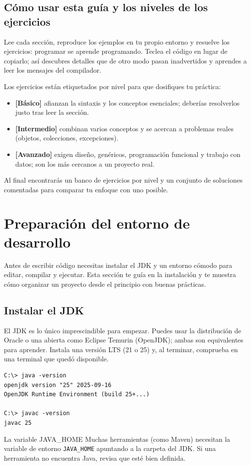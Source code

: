 \documentclass[11pt]{article}
\begin{document}
\subsection{Cómo usar esta guía y los niveles de los ejercicios}
Lee cada sección, reproduce los ejemplos en tu propio entorno y resuelve los ejercicios: programar se aprende programando. Teclea el código en lugar de copiarlo; así descubres detalles que de otro modo pasan inadvertidos y aprendes a leer los mensajes del compilador.

Los ejercicios están etiquetados por nivel para que dosifiques tu práctica:

\begin{itemize}[leftmargin=1.4em,itemsep=2pt,topsep=2pt]
\item \textbf{[Básico]} afianzan la sintaxis y los conceptos esenciales; deberías resolverlos justo tras leer la sección.
\item \textbf{[Intermedio]} combinan varios conceptos y se acercan a problemas reales (objetos, colecciones, excepciones).
\item \textbf{[Avanzado]} exigen diseño, genéricos, programación funcional y trabajo con datos; son los más cercanos a un proyecto real.
\end{itemize}
Al final encontrarás un banco de ejercicios por nivel y un conjunto de soluciones comentadas para comparar tu enfoque con uno posible.

\section{Preparación del entorno de desarrollo}
Antes de escribir código necesitas instalar el JDK y un entorno cómodo para editar, compilar y ejecutar. Esta sección te guía en la instalación y te muestra cómo organizar un proyecto desde el principio con buenas prácticas.

\subsection{Instalar el JDK}
El JDK es lo único imprescindible para empezar. Puedes usar la distribución de Oracle o una abierta como Eclipse Temurin (OpenJDK); ambas son equivalentes para aprender. Instala una versión LTS (21 o 25) y, al terminar, comprueba en una terminal que quedó disponible.

\begin{cajacodigo}
\begin{lstlisting}[style=markup]
C:\> java -version
openjdk version "25" 2025-09-16
OpenJDK Runtime Environment (build 25+...)

C:\> javac -version
javac 25
\end{lstlisting}
\end{cajacodigo}
\vspace{2pt}
\begin{cajatip}{La variable JAVA\_HOME}
Muchas herramientas (como Maven) necesitan la variable de entorno \texttt{JAVA\_HOME} apuntando a la carpeta del JDK. Si una herramienta no encuentra Java, revisa que esté bien definida.\par
\end{cajatip}
\end{document}
